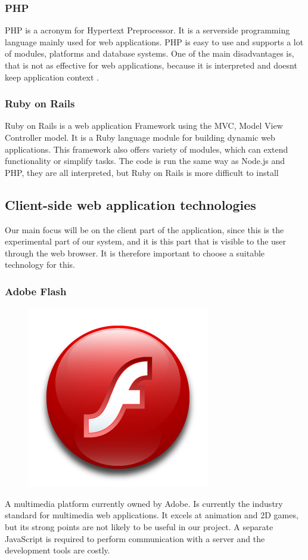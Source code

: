 \subsubsection*{PHP}
PHP is a acronym for Hypertext Preprocessor. It is a serverside programming language mainly used for web applications. PHP is easy to use and supports a lot of modules, platforms and database systems. One of the main disadvantages is, that is not as effective for web applications, because it is interpreted and doesnt keep application context \cite{php-whatis}.

\subsubsection*{Ruby on Rails}
Ruby on Rails is a web application Framework using the MVC, Model View Controller model. It is a Ruby language module for building dynamic web applications. This framework also offers variety of modules, which can extend functionality or simplify tasks. The code is run the same way as Node.js and PHP, they are all interpreted, but Ruby on Rails is more difficult to install \cite{ror-about}


\subsection{Client-side web application technologies}
Our main focus will be on the client part of the application, since this is the experimental part of our system, and it is this part that is visible to the user through the web browser. It is therefore important to choose a suitable technology for this.

\subsubsection{Adobe Flash}

\begin{figure}
\vspace{-30pt}
\centering
\includegraphics[width = .10\textwidth]{image/flash-logo.png}
\end{figure}


A multimedia platform currently owned by Adobe. Is currently the industry standard for multimedia web applications. It excels at animation and 2D games, but its strong points are not likely to be useful in our project. A separate JavaScript is required to perform communication with a server and the development tools are costly.


